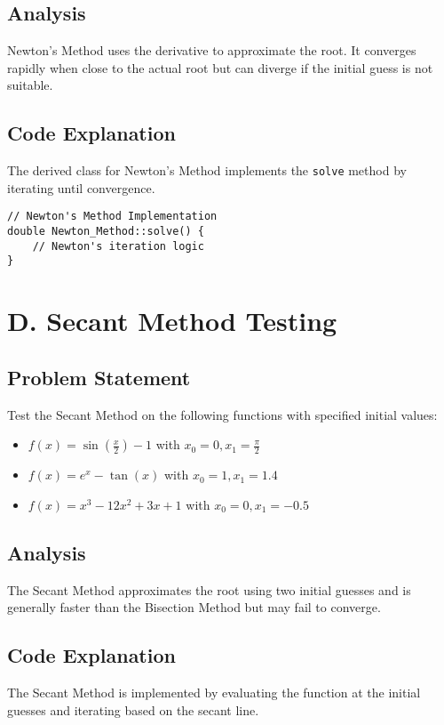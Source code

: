 \documentclass{article}
\begin{document}
\subsection{Analysis}
Newton's Method uses the derivative to approximate the root. It converges rapidly when close to the actual root but can diverge if the initial guess is not suitable.

\subsection{Code Explanation}
The derived class for Newton's Method implements the \texttt{solve} method by iterating until convergence.

\begin{verbatim}
// Newton's Method Implementation
double Newton_Method::solve() {
    // Newton's iteration logic
}
\end{verbatim}

\section{D. Secant Method Testing}
\subsection{Problem Statement}
Test the Secant Method on the following functions with specified initial values:
\begin{itemize}
    \item \( f(x) = \sin\left(\frac{x}{2}\right) - 1 \) with \( x_0 = 0, x_1 = \frac{\pi}{2} \)
    \item \( f(x) = e^x - \tan(x) \) with \( x_0 = 1, x_1 = 1.4 \)
    \item \( f(x) = x^3 - 12x^2 + 3x + 1 \) with \( x_0 = 0, x_1 = -0.5 \)
\end{itemize}

\subsection{Analysis}
The Secant Method approximates the root using two initial guesses and is generally faster than the Bisection Method but may fail to converge.

\subsection{Code Explanation}
The Secant Method is implemented by evaluating the function at the initial guesses and iterating based on the secant line.
\end{document}
